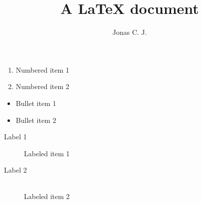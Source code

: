 \documentclass[a4paper, 12pt]{article}
\title{A \LaTeX{} document}
\author{Jonas C. J.}
\begin{document}
\begin{enumerate}
	\item Numbered item 1
	\item Numbered item 2
\end{enumerate}

\begin{itemize}
	\item Bullet item 1
	\item Bullet item 2
\end{itemize}

\begin{description}
	\item[Label 1] Labeled item 1
	\item[Label 2] \hfill \\ Labeled item 2
\end{description}
\end{document}
